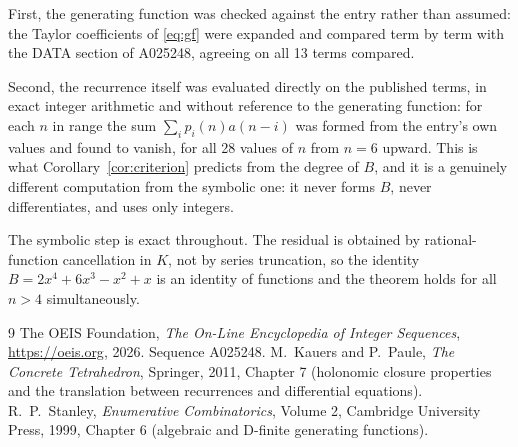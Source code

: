 \documentclass[11pt,a4paper]{article}
\theoremstyle{plain}
\theoremstyle{definition}
\begin{document}
First, the generating function was checked against the entry rather than assumed: the
Taylor coefficients of \eqref{eq:gf} were expanded and compared term by term with the DATA
section of A025248, agreeing on all 13 terms compared.

Second, the recurrence itself was evaluated directly on the published terms, in exact
integer arithmetic and without reference to the generating function: for each $n$ in range
the sum $\sum_{i}p_{i}(n)a(n-i)$ was formed from the entry's own values and found to
vanish, for all 28 values of $n$ from $n=6$ upward. This is what
Corollary~\ref{cor:criterion} predicts from the degree of $B$, and it is a genuinely
different computation from the symbolic one: it never forms $B$, never differentiates, and
uses only integers.

The symbolic step is exact throughout. The residual is obtained by rational-function
cancellation in $K$, not by series truncation, so the identity $B=2 x^{4} + 6 x^{3} - x^{2} + x$ is an
identity of functions and the theorem holds for all $n>4$ simultaneously.

\begin{thebibliography}{9}
 The OEIS Foundation, \emph{The On-Line Encyclopedia of Integer Sequences},
\url{https://oeis.org}, 2026. Sequence A025248.
 M.~Kauers and P.~Paule, \emph{The Concrete Tetrahedron}, Springer, 2011,
Chapter 7 (holonomic closure properties and the translation between recurrences and
differential equations).
 R.~P.~Stanley, \emph{Enumerative Combinatorics}, Volume 2, Cambridge
University Press, 1999, Chapter 6 (algebraic and D-finite generating functions).
\end{thebibliography}
\end{document}
